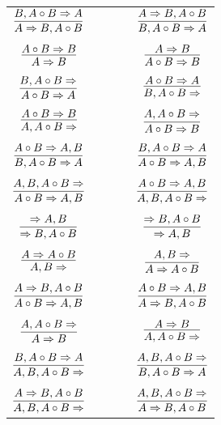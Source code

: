 \documentclass[11pt]{article}
\begin{document}
\begin{center}
\begin{tabular}{ccc}
$\infer{A\Rightarrow B, A\circ B}{B, A\circ B\Rightarrow A}$ & \ \ \ \ & $\infer{B, A\circ B\Rightarrow A}{A\Rightarrow B, A\circ B}$ \\
&& \\
$\infer{A\Rightarrow B}{A\circ B\Rightarrow B}$ && $\infer{A\circ B\Rightarrow B}{A\Rightarrow B}$ \\
&& \\
$\infer{A\circ B\Rightarrow A}{B, A\circ B\Rightarrow }$ && $\infer{B, A\circ B\Rightarrow }{A\circ B\Rightarrow A}$ \\
&& \\
$\infer{A, A\circ B\Rightarrow }{A\circ B\Rightarrow B}$ && $\infer{A\circ B\Rightarrow B}{A, A\circ B\Rightarrow }$ \\
&& \\
$\infer{B, A\circ B\Rightarrow A}{A\circ B\Rightarrow A, B}$
&& $\infer{A\circ B\Rightarrow A, B}{B, A\circ B\Rightarrow A}$ \\
&& \\
$\infer{A\circ B\Rightarrow A, B}{A, B, A\circ B\Rightarrow }$ && $\infer{A, B, A\circ B\Rightarrow }{A\circ B\Rightarrow A, B}$ \\
&& \\
$\infer{\Rightarrow B, A\circ B}{\Rightarrow A, B}$ && $\infer{\Rightarrow A, B}{\Rightarrow B, A\circ B}$ \\
&& \\
$\infer{A, B\Rightarrow }{A\Rightarrow A\circ B}$ && $\infer{A\Rightarrow A\circ B}{A, B\Rightarrow }$ \\
&& \\
$\infer{A\circ B\Rightarrow A, B}{A\Rightarrow B, A\circ B}$ && $\infer{A\Rightarrow B, A\circ B}{A\circ B\Rightarrow A, B}$ \\
&& \\
$\infer{A\Rightarrow B}{A, A\circ B\Rightarrow }$ && $\infer{A, A\circ B\Rightarrow }{A\Rightarrow B}$ \\
&& \\
$\infer{A, B, A\circ B\Rightarrow }{B, A\circ B\Rightarrow A}$ && $\infer{B, A\circ B\Rightarrow A}{A, B, A\circ B\Rightarrow }$ \\
&& \\
$\infer{A, B, A\circ B\Rightarrow }{A\Rightarrow B, A\circ B}$ && $\infer{A\Rightarrow B, A\circ B}{A, B, A\circ B\Rightarrow }$ \\
\end{tabular}

\end{center}
\end{document}
